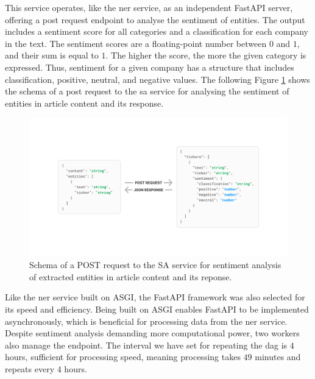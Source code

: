 This service operates, like the \acrshort{ner} service, as an independent FastAPI server, offering a post request endpoint to analyse the sentiment of entities. The output includes a sentiment score for all categories and a classification for each company in the text. The sentiment scores are a floating-point number between $0$ and $1$, and their sum is equal to $1$. The higher the score, the more the given category is expressed. Thus, sentiment for a given company has a structure that includes classification, positive, neutral, and negative values. The following Figure \ref{fig:architecture-sa-req-res} shows the schema of a post request to the \acrshort{sa} service for analysing the sentiment of entities in article content and its response.

\begin{figure}[ht]
    \centering
    \includegraphics[width=\textwidth]{img/architecture/sa-req-res.pdf}
    \caption{Schema of a POST request to the SA service for sentiment analysis of extracted entities in article content and its reponse.}
    \label{fig:architecture-sa-req-res}
\end{figure}

Like the \acrshort{ner} service built on ASGI, the FastAPI framework was also selected for its speed and efficiency. Being built on ASGI enables FastAPI to be implemented asynchronously, which is beneficial for processing data from the \acrshort{ner} service. Despite sentiment analysis demanding more computational power, two workers also manage the endpoint. The interval we have set for repeating the \acrshort{dag} is $4$ hours, sufficient for processing speed, meaning processing takes $49$ minutes and repeats every $4$ hours.

